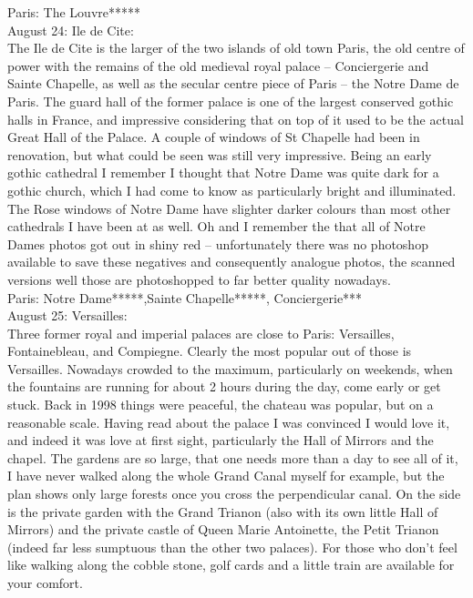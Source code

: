 Paris: The Louvre*****\\

August 24: Ile de Cite:\\
The Ile de Cite is the larger of the two islands of old town Paris, the old centre of power with the remains of the old medieval royal palace -- Conciergerie and Sainte Chapelle, as well as the secular centre piece of Paris -- the Notre Dame de Paris. The guard hall of the former palace is one of the largest conserved gothic halls in France, and impressive considering that on top of it used to be the actual Great Hall of the Palace. A couple of windows of St Chapelle had been in renovation, but what could be seen was still very impressive. Being an early gothic cathedral I remember I thought that Notre Dame was quite dark for a gothic church, which I had come to know as particularly bright and illuminated. The Rose windows of Notre Dame have slighter darker colours than most other cathedrals I have been at as well. Oh and I remember the that all of Notre Dames photos got out in shiny red -- unfortunately there was no photoshop available to save these negatives and consequently analogue photos, the scanned versions well those are photoshopped to far better quality nowadays.\\ 

Paris: Notre Dame*****,Sainte Chapelle*****, Conciergerie***\\

August 25: Versailles:\\
Three former royal and imperial palaces are close to Paris: Versailles, Fontainebleau, and Compiegne. Clearly the most popular out of those is Versailles. Nowadays crowded to the maximum, particularly on weekends, when the fountains are running for about 2 hours during the day, come early or get stuck. Back in 1998 things were peaceful, the chateau was popular, but on a reasonable scale. Having read about the palace I was convinced I would love it, and indeed it was love at first sight, particularly the Hall of Mirrors and the chapel. The gardens are so large, that one needs more than a day to see all of it, I have never walked along the whole Grand Canal myself for example, but the plan shows only large forests once you cross the perpendicular canal. On the side is the private garden with the Grand Trianon (also with its own little Hall of Mirrors) and the private castle of Queen Marie Antoinette, the Petit Trianon (indeed far less sumptuous than the other two palaces). For those who don't feel like walking along the cobble stone, golf cards and a little train are available for your comfort.\\

